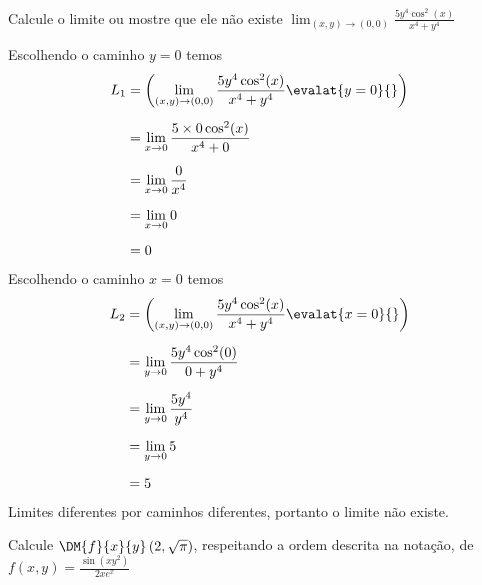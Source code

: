 \documentclass[a4paper,12pt,fleqn]{article}
\begin{document}

Calcule o limite ou mostre que ele não existe
\(
  \lim_{(x, y)\to(0, 0)} \frac{5y^4\cos^2(x)}{x^4+y^4}
\)

\begin{answer}
  Escolhendo o caminho $y=0$ temos
  \begin{align*}
    L_1
    & = \left(\lim_{(x, y)\to(0, 0)} \frac{5y^4\cos^2(x)}{x^4+y^4} \evalat{y=0}{} \right) \\[2mm]
    & = \lim_{x\to 0} \frac{5\times0\cos^2(x)}{x^4+0} \\[2mm]
    & = \lim_{x\to 0} \frac{0}{x^4} \\[2mm]
    & = \lim_{x\to 0} 0 \\[2mm]
    & = 0
  \end{align*}
  Escolhendo o caminho $x=0$ temos
  \begin{align*}
    L_2
    & = \left(\lim_{(x, y)\to(0, 0)} \frac{5y^4\cos^2(x)}{x^4+y^4} \evalat{x=0}{} \right) \\[2mm]
    & = \lim_{y\to 0} \frac{5y^4\cos^2(0)}{0+y^4} \\[2mm]
    & = \lim_{y\to 0} \frac{5y^4}{y^4} \\[2mm]
    & = \lim_{y\to 0} 5 \\[2mm]
    & = 5
  \end{align*}
  Limites diferentes por caminhos diferentes, portanto o limite não existe.
\end{answer}

Calcule \(\DM{f}{x}{y}\left(2, \sqrt{\pi}\right)\)\!,
respeitando a ordem descrita na notação, de
\(
  f(x, y) = \frac{\sin\left(xy^2\right)}{2xe^x}
\)
\end{document}
